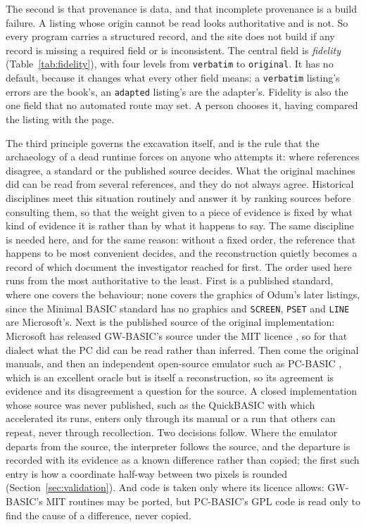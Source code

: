 The second is that provenance is data, and that incomplete provenance is a build failure. A listing whose origin cannot be read looks authoritative and is not. So every program carries a structured record, and the site does not build if any record is missing a required field or is inconsistent. The central field is \emph{fidelity} (Table~\ref{tab:fidelity}), with four levels from \texttt{verbatim} to \texttt{original}. It has no default, because it changes what every other field means: a \texttt{verbatim} listing's errors are the book's, an \texttt{adapted} listing's are the adapter's. Fidelity is also the one field that no automated route may set. A person chooses it, having compared the listing with the page.

The third principle governs the excavation itself, and is the rule that the archaeology of a dead runtime forces on anyone who attempts it: where references disagree, a standard or the published source decides. What the original machines did can be read from several references, and they do not always agree. Historical disciplines meet this situation routinely and answer it by ranking sources before consulting them, so that the weight given to a piece of evidence is fixed by what kind of evidence it is rather than by what it happens to say. The same discipline is needed here, and for the same reason: without a fixed order, the reference that happens to be most convenient decides, and the reconstruction quietly becomes a record of which document the investigator reached for first. The order used here runs from the most authoritative to the least. First is a published standard, where one covers the behaviour; none covers the graphics of Odum's later listings, since the Minimal BASIC standard \citep{ecma55} has no graphics and \texttt{SCREEN}, \texttt{PSET} and \texttt{LINE} are Microsoft's. Next is the published source of the original implementation: Microsoft has released GW-BASIC's source under the MIT licence \citep{gwbasic}, so for that dialect what the PC did can be read rather than inferred. Then come the original manuals, and then an independent open-source emulator such as PC-BASIC \citep{pcbasic}, which is an excellent oracle but is itself a reconstruction, so its agreement is evidence and its disagreement a question for the source. A closed implementation whose source was never published, such as the QuickBASIC with which \citet{odum1989} accelerated its runs, enters only through its manual or a run that others can repeat, never through recollection. Two decisions follow. Where the emulator departs from the source, the interpreter follows the source, and the departure is recorded with its evidence as a known difference rather than copied; the first such entry is how a coordinate half-way between two pixels is rounded (Section~\ref{sec:validation}). And code is taken only where its licence allows: GW-BASIC's MIT routines may be ported, but PC-BASIC's GPL code is read only to find the cause of a difference, never copied.

